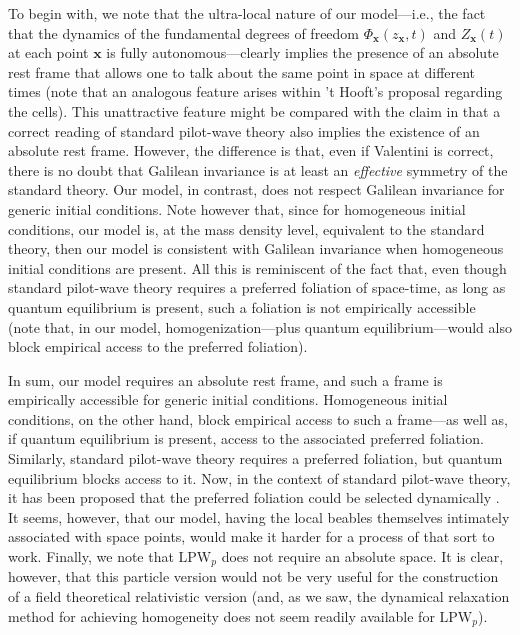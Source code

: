 \documentclass[letterpaper,12pt]{article}
\begin{document}
To begin with, we note that the ultra-local nature of our model---i.e., the fact that the dynamics of the fundamental degrees of freedom $\Phi_\mathbf{x}(z_{\mathbf{x}},t)$ and $Z_\mathbf{x}(t)$ at each point $\mathbf{x}$ is fully autonomous---clearly implies the presence of an absolute rest frame that allows one to talk about the same point in space at different times (note that an analogous feature arises within 't Hooft's proposal regarding the cells). This unattractive feature might be compared with the claim in \cite{Valentini1997} that a correct reading of standard pilot-wave theory also implies the existence of an absolute rest frame. However, the difference is that, even if Valentini is correct, there is no doubt that Galilean invariance is at least an \emph{effective} symmetry of the standard theory. Our model, in contrast, does not respect Galilean invariance for generic initial conditions. Note however that, since for homogeneous initial conditions, our model is, at the mass density level, equivalent to the standard theory, then our model is consistent with Galilean invariance when homogeneous initial conditions are present. All this is reminiscent of the fact that, even though standard pilot-wave theory requires a preferred foliation of space-time, as long as quantum equilibrium is present, such a foliation is not empirically accessible (note that, in our model, homogenization---plus quantum equilibrium---would also block empirical access to the preferred foliation). 

In sum, our model requires an absolute rest frame, and such a frame is empirically accessible for generic initial conditions. Homogeneous initial conditions, on the other hand, block empirical access to such a frame---as well as, if quantum equilibrium is present, access to the associated preferred foliation. Similarly, standard pilot-wave theory requires a preferred foliation, but quantum equilibrium blocks access to it. Now, in the context of standard pilot-wave theory, it has been proposed that the preferred foliation could be selected dynamically \cite{Durr}. It seems, however, that our model, having the local beables themselves intimately associated with space points, would make it harder for a process of that sort to work. Finally, we note that $\text{LPW}_p$ does not require an absolute space. It is clear, however, that this particle version would not be very useful for the construction of a field theoretical relativistic version (and, as we saw, the dynamical relaxation method for achieving homogeneity does not seem readily available for $\text{LPW}_p$).
\end{document}
